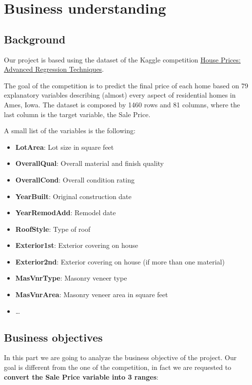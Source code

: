 \chapter{Business understanding}
\label{sec:business_understanding}

\section{Background}
Our project is based using the dataset of the Kaggle competition \href{https://www.kaggle.com/c/house-prices-advanced-regression-techniques}{House Prices: Advanced Regression Techniques}. 

The goal of the competition is to predict the final price of each home based on 79 explanatory variables describing (almost) every aspect of residential homes in Ames, Iowa.
The dataset is composed by 1460 rows and 81 columns, where the last column is the target variable, the Sale Price.

A small list of the variables is the following:

\begin{itemize}
    \item \textbf{LotArea}: Lot size in square feet
    \item \textbf{OverallQual}: Overall material and finish quality
    \item \textbf{OverallCond}: Overall condition rating
    \item \textbf{YearBuilt}: Original construction date
    \item \textbf{YearRemodAdd}: Remodel date
    \item \textbf{RoofStyle}: Type of roof
    \item \textbf{Exterior1st}: Exterior covering on house
    \item \textbf{Exterior2nd}: Exterior covering on house (if more than one material)
    \item \textbf{MasVnrType}: Masonry veneer type
    \item \textbf{MasVnrArea}: Masonry veneer area in square feet
    \item \dots
\end{itemize}
\section{Business objectives}
\label{subsec:business_objectives}

In this part we are going to analyze the business objective of the project.
Our goal is different from the one of the competition, in fact we are requested to \textbf{convert the Sale Price variable into 3 ranges}:


